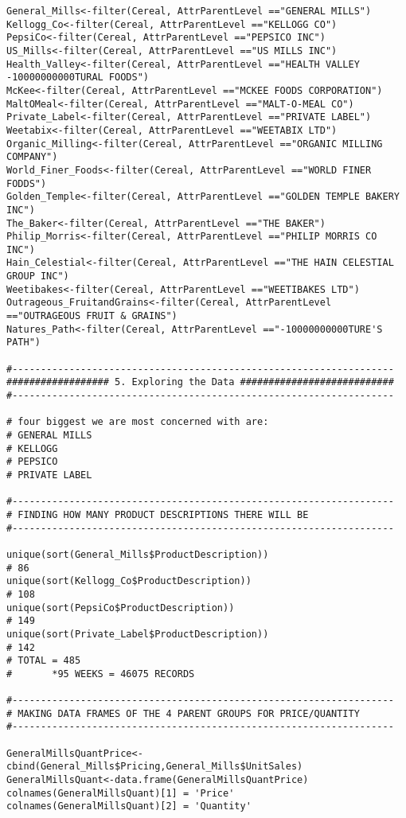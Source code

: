 \documentclass[12pt,english]{article}
\begin{document}
\begin{lstlisting}
General_Mills<-filter(Cereal, AttrParentLevel =="GENERAL MILLS")
Kellogg_Co<-filter(Cereal, AttrParentLevel =="KELLOGG CO")
PepsiCo<-filter(Cereal, AttrParentLevel =="PEPSICO INC")
US_Mills<-filter(Cereal, AttrParentLevel =="US MILLS INC")
Health_Valley<-filter(Cereal, AttrParentLevel =="HEALTH VALLEY -10000000000TURAL FOODS")
McKee<-filter(Cereal, AttrParentLevel =="MCKEE FOODS CORPORATION")
MaltOMeal<-filter(Cereal, AttrParentLevel =="MALT-O-MEAL CO")
Private_Label<-filter(Cereal, AttrParentLevel =="PRIVATE LABEL")
Weetabix<-filter(Cereal, AttrParentLevel =="WEETABIX LTD")
Organic_Milling<-filter(Cereal, AttrParentLevel =="ORGANIC MILLING COMPANY")
World_Finer_Foods<-filter(Cereal, AttrParentLevel =="WORLD FINER FODDS")
Golden_Temple<-filter(Cereal, AttrParentLevel =="GOLDEN TEMPLE BAKERY INC")
The_Baker<-filter(Cereal, AttrParentLevel =="THE BAKER")
Philip_Morris<-filter(Cereal, AttrParentLevel =="PHILIP MORRIS CO INC")
Hain_Celestial<-filter(Cereal, AttrParentLevel =="THE HAIN CELESTIAL GROUP INC")
Weetibakes<-filter(Cereal, AttrParentLevel =="WEETIBAKES LTD")
Outrageous_FruitandGrains<-filter(Cereal, AttrParentLevel =="OUTRAGEOUS FRUIT & GRAINS")
Natures_Path<-filter(Cereal, AttrParentLevel =="-10000000000TURE'S PATH")

#-------------------------------------------------------------------
################## 5. Exploring the Data ###########################
#-------------------------------------------------------------------

# four biggest we are most concerned with are:
# GENERAL MILLS
# KELLOGG
# PEPSICO
# PRIVATE LABEL

#-------------------------------------------------------------------
# FINDING HOW MANY PRODUCT DESCRIPTIONS THERE WILL BE 
#-------------------------------------------------------------------

unique(sort(General_Mills$ProductDescription))
# 86
unique(sort(Kellogg_Co$ProductDescription))
# 108
unique(sort(PepsiCo$ProductDescription))
# 149
unique(sort(Private_Label$ProductDescription))
# 142
# TOTAL = 485
#       *95 WEEKS = 46075 RECORDS

#-------------------------------------------------------------------
# MAKING DATA FRAMES OF THE 4 PARENT GROUPS FOR PRICE/QUANTITY
#-------------------------------------------------------------------

GeneralMillsQuantPrice<-cbind(General_Mills$Pricing,General_Mills$UnitSales)
GeneralMillsQuant<-data.frame(GeneralMillsQuantPrice)
colnames(GeneralMillsQuant)[1] = 'Price'
colnames(GeneralMillsQuant)[2] = 'Quantity'


\end{lstlisting}
\end{document}

